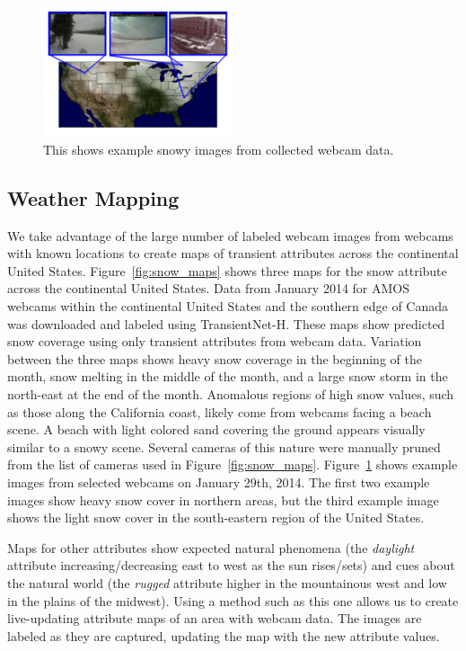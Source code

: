 \documentclass[10pt,twocolumn,letterpaper]{article}
\newcommand{\figref}[1]{Figure~\ref{fig:#1}}
\begin{document}
\begin{figure}[t]
	\centering
		\includegraphics[width=0.5\textwidth, trim= 0mm 10mm 0mm 0mm]{figs/snow_exs.pdf}
		\caption{This shows example snowy images from collected webcam data.}
		\label{fig:snow_exs}
\end{figure}

\subsection{Weather Mapping}

We take advantage of the large number of labeled webcam images from webcams
with known locations to create maps of transient attributes across the
continental United States.  \figref{snow_maps} shows three maps for the snow
attribute across the continental United States.  Data from January 2014 for
AMOS webcams within the continental United States and the southern edge of
Canada was downloaded and labeled using TransientNet-H.  These maps show
predicted snow coverage using only transient attributes from webcam data.
Variation between the three maps shows heavy snow coverage in the beginning of
the month, snow melting in the middle of the month, and a large snow storm in
the north-east at the end of the month.  Anomalous regions of high snow values,
such as those along the California coast, likely come from webcams facing a
beach scene.  A beach with light colored sand covering the ground appears
visually similar to a snowy scene.  Several cameras of this nature were
manually pruned from the list of cameras used in \figref{snow_maps}.
\figref{snow_exs} shows example images from selected webcams on January 29th,
2014. The first two example images show heavy snow cover in northern areas, but
the third example image shows the light snow cover in the south-eastern region
of the United States.  

Maps for other attributes show expected natural phenomena (the
\textit{daylight} attribute increasing/decreasing east to west as the sun
rises/sets) and cues about the natural world (the \textit{rugged} attribute
higher in the mountainous west and low in the plains of the midwest).  Using a
method such as this one allows us to create live-updating attribute maps of an
area with webcam data.  The images are labeled as they are captured, updating
the map with the new attribute values. 
\end{document}
